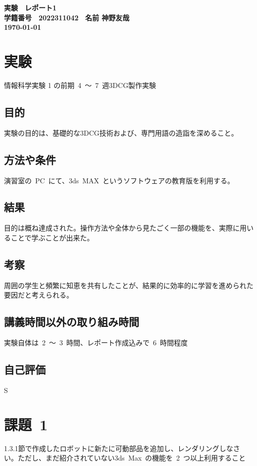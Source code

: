 \documentclass[a4j]{jarticle}
\begin{document}
\vfill
\begin{screen}
  \begin{center}
    \huge\bf 実験　レポート1\\
    \vspace{5mm}
    \large\bf
    学籍番号　2022311042 \ 名前 神野友哉\\
    \today
  \end{center}
\end{screen}
\thispagestyle{empty}
\tableofcontents

\newpage
\section{実験}
%
情報科学実験 1 の前期\ 4\ ～\ 7\ 週\quad 3DCG製作実験
%
\subsection{目的}
%
実験の目的は、基礎的な3DCG技術および、専門用語の造詣を深めること。
%
\subsection{方法や条件}
%
演習室の\ PC\ にて、3ds\ MAX\ というソフトウェアの教育版を利用する。
%
\subsection{結果}
%
目的は概ね達成された。操作方法や全体から見たごく一部の機能を、実際に用いることで学ぶことが出来た。
%
\subsection{考察}
%
周囲の学生と頻繁に知恵を共有したことが、結果的に効率的に学習を進められた要因だと考えられる。
%
\subsection{講義時間以外の取り組み時間}
%
実験自体は\ 2\ ～\ 3\ 時間、レポート作成込みで\ 6\ 時間程度
%
\subsection{自己評価}
%
S
%


\newpage
\section{課題\ 1}
1.3.1節で作成したロボットに新たに可動部品を追加し、レンダリングしなさい。ただし、まだ紹介されていない3ds\ Max\ の機能を\ 2\ つ以上利用すること
\end{document}
